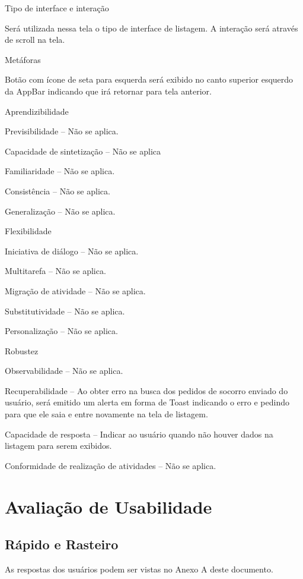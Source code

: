 \begin{alineas}
  \item Tipo de interface e interação
  
Será utilizada nessa tela o tipo de interface de listagem. A interação será através de scroll na tela. 
  \item Metáforas
  
Botão com ícone de seta para esquerda será exibido no canto superior esquerdo da AppBar indicando que irá retornar para tela anterior.
  \item Aprendizibilidade
  
Previsibilidade – Não se aplica.

Capacidade de sintetização – Não se aplica

Familiaridade – Não se aplica.

Consistência – Não se aplica.

Generalização – Não se aplica.
  \item Flexibilidade
  
Iniciativa de diálogo – Não se aplica.

Multitarefa – Não se aplica.

Migração de atividade – Não se aplica.

Substitutividade – Não se aplica.

Personalização – Não se aplica.

  \item Robustez
  
Observabilidade – Não se aplica.

Recuperabilidade – Ao obter erro na busca dos pedidos de socorro enviado do usuário, será emitido um alerta em forma de Toast indicando o erro e pedindo para que ele saia e entre novamente na tela de listagem. 

Capacidade de resposta – Indicar ao usuário quando não houver dados na listagem para serem exibidos.

Conformidade de realização de atividades – Não se aplica.

\end{alineas}


\section{Avaliação de Usabilidade}
\subsection{Rápido e Rasteiro}
As respostas dos usuários podem ser vistas no Anexo A deste documento.

